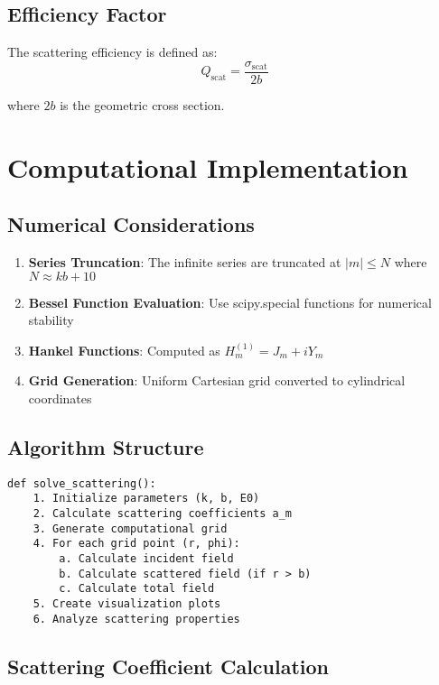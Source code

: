 \documentclass[11pt,a4paper]{article}
\begin{document}
\subsection{Efficiency Factor}

The scattering efficiency is defined as:
\begin{equation}
Q_{\text{scat}} = \frac{\sigma_{\text{scat}}}{2b} \label{eq:efficiency_factor}
\end{equation}

where $2b$ is the geometric cross section.

\section{Computational Implementation}

\subsection{Numerical Considerations}

\begin{enumerate}
\item \textbf{Series Truncation}: The infinite series are truncated at $|m| \leq N$ where $N \approx kb + 10$
\item \textbf{Bessel Function Evaluation}: Use scipy.special functions for numerical stability
\item \textbf{Hankel Functions}: Computed as $H_m^{(1)} = J_m + iY_m$
\item \textbf{Grid Generation}: Uniform Cartesian grid converted to cylindrical coordinates
\end{enumerate}

\subsection{Algorithm Structure}

\begin{lstlisting}[caption=Main Algorithm Structure]
def solve_scattering():
    1. Initialize parameters (k, b, E0)
    2. Calculate scattering coefficients a_m
    3. Generate computational grid
    4. For each grid point (r, phi):
        a. Calculate incident field
        b. Calculate scattered field (if r > b)
        c. Calculate total field
    5. Create visualization plots
    6. Analyze scattering properties
\end{lstlisting}

\subsection{Scattering Coefficient Calculation}
\end{document}
